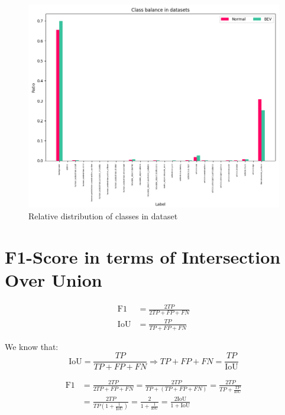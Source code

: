 \begin{figure}[h!]
    \centering
    \includegraphics[width=\linewidth]{images/appendix/dataset_class_balance_ratio.png}
    \caption{Relative distribution of classes in dataset}
    \label{fig:dataset_class_balance_ratio}
\end{figure}

\newpage


\section{F1-Score in terms of Intersection Over Union} \label{appendix:f1_iou}
\begin{equation}
    \begin{aligned}
    \text{F1} &= \frac{2TP}{2TP + FP + FN} \\
    \text{IoU} &= \frac{TP}{TP + FP + FN}
    \end{aligned}
\end{equation}
    
\noindent
We know that:
\[
\text{IoU} = \frac{TP}{TP + FP + FN} \Rightarrow TP + FP + FN = \frac{TP}{\text{IoU}}
\]

\begin{equation}
    \begin{aligned}
        \text{F1} &= \frac{2TP}{2TP + FP + FN} = \frac{2TP}{TP + (TP + FP + FN)} = \frac{2TP}{TP + \frac{TP}{\text{IoU}}} \\
        &= \frac{2TP}{TP \left(1 + \frac{1}{\text{IoU}}\right)} = \frac{2}{1 + \frac{1}{\text{IoU}}} = \frac{2\text{IoU}}{1 + \text{IoU}}
    \end{aligned}
\end{equation}
    


